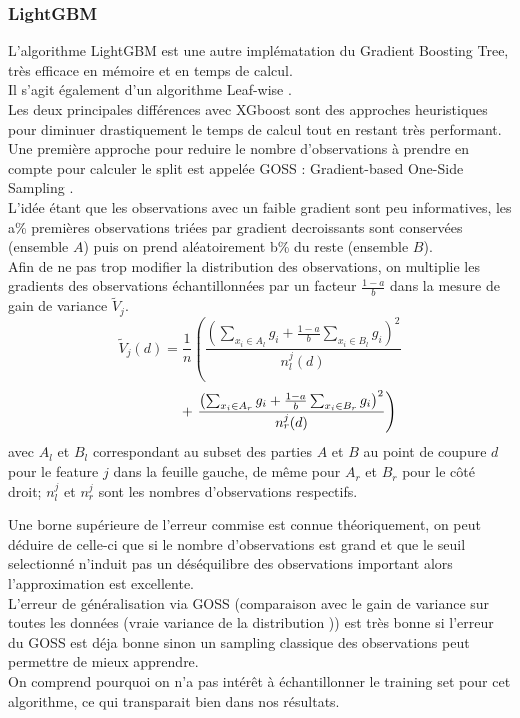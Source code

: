 \documentclass[french]{article}
\begin{document}
\begin{multicols}{2}
\subsubsection{LightGBM}
L'algorithme LightGBM est une autre implématation du Gradient Boosting Tree, très efficace en mémoire et en temps de calcul.\\
Il s'agit également d'un algorithme \og Leaf-wise \fg{}.\\
Les deux principales différences avec XGboost sont des approches heuristiques pour diminuer drastiquement le temps de calcul tout en restant très performant.\\
Une première approche pour reduire le nombre d'observations à prendre en compte pour calculer le split est appelée GOSS : \og Gradient-based One-Side Sampling \fg{} \cite{micr}.\\
L'idée étant que les observations avec un faible gradient sont peu informatives, les a\% premières observations triées par gradient decroissants sont conservées (ensemble $A$) puis on prend aléatoirement b\% du reste (ensemble $B$).\\
Afin de ne pas trop modifier la distribution des observations, on multiplie les gradients des observations échantillonnées par un facteur $\frac{1-a}{b}$ dans la mesure de gain de variance $\tilde{V}_{j}$.\\
\[
\tilde{V}_{j}(d)=\frac{1}{n}\left(\frac{\left(\sum_{x_{i} \in A_{l}} g_{i}+\frac{1-a}{b} \sum_{x_{i} \in B_{l}} g_{i}\right)^{2}}{n_{l}^{j}(d)} \right. \]
\[ \null \qquad \qquad + \left. \frac{\left(\sum_{x_{i} \in A_{r}} g_{i}+\frac{1-a}{b} \sum_{x_{i} \in B_{r}} g_{i}\right)^{2}}{n_{r}^{j}(d)}\right)
\]
avec $A_l$ et $B_l$ correspondant au subset des parties $A$ et $B$ au point de coupure $d$ pour le feature $j$ dans la feuille gauche, de même pour $A_r$ et $B_r$ pour le côté droit; $n_l^j$ et $n_r^j$ sont les nombres d'observations respectifs\footnotemark[14].

Une borne supérieure de l'erreur commise est connue théoriquement, on peut déduire de celle-ci que si le nombre d'observations est grand et que le seuil selectionné n'induit pas un déséquilibre des observations important alors l'approximation est excellente.\\
L'erreur de généralisation via GOSS (comparaison avec le gain de variance sur toutes les données (\og vraie variance de la distribution \fg{})) est très bonne si l'erreur du GOSS est déja bonne sinon un sampling classique des observations peut permettre de mieux apprendre.\\
On comprend pourquoi on n'a pas intérêt à échantillonner le training set pour cet algorithme, ce qui transparait bien dans nos résultats.


\end{multicols}
\end{document}
